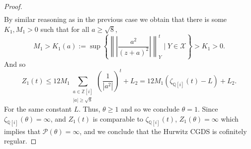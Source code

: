 \documentclass[10pt,a4paper]{amsart}
\newcommand{\QQ}{\ensuremath{\mathbb Q}}%
\newcommand{\ZZ}{\ensuremath{\mathbb Z}} %
\newcommand{\cX}{\ensuremath{\mathcal{X}}}
\begin{document}
\begin{proof}
\begin{align*}
    \end{align*}
    By similar reasoning as in the previous case we obtain that there is some $K_1,M_1>0$ such that for all $a\geq \sqrt 8$,
    $$
        M_1> K_1(a) := \sup\left\{\left\|\left\vert\frac{a^2}{(z+a)^2}\right\vert\right\|_Y^t\;\Bigg|\; Y\in \cX \right\} > K_1 >0.
    $$ 
    And so 
    $$
        Z_1(t) \leq 12M_1\sum_{\substack{a\in \ZZ[i]\\ |a|\geq \sqrt{8}}}\left(\frac{1}{|a^2|}\right)^t +L_2 = 12M_1(\zeta_{\QQ[i]}(t)-L)+L_2.
    $$
    For the same constant $L$. Thus, $\theta\geq 1$ and so we conclude $\theta = 1$. Since $\zeta_{\QQ[i]}(\theta) = \infty$, and $Z_1(t)$ is comparable to $\zeta_{\QQ[i]}(t)$, $Z_1(\theta) = \infty$ which implies that $\mathcal P(\theta) = \infty$, and we conclude that the Hurwitz CGDS is cofinitely regular.
\end{proof}
\end{document}
